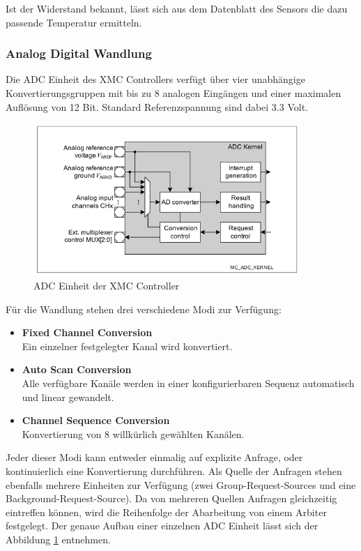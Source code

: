 Ist der Widerstand bekannt, lässt sich aus dem Datenblatt des Sensors die dazu passende Temperatur ermitteln.

\subsubsection{Analog Digital Wandlung}
Die ADC Einheit des XMC Controllers verfügt über vier unabhängige Konvertierungsgruppen mit bis zu 8 analogen Eingängen und einer maximalen Auflösung von 12 Bit. Standard Referenzspannung sind dabei 3.3 Volt.

\begin{figure}[ht]
\centering
\includegraphics[width=0.9\textwidth]{sensor/xmc_adc.PNG}
\caption{ADC Einheit der XMC Controller}
\label{img:xmc_adc}
\end{figure}

Für die Wandlung stehen drei verschiedene Modi zur Verfügung: 
\begin{itemize}
\item \textbf{Fixed Channel Conversion} \\
Ein einzelner festgelegter Kanal wird konvertiert.
\item \textbf{Auto Scan Conversion} \\
Alle verfügbare Kanäle werden in einer konfigurierbaren Sequenz automatisch und linear gewandelt.
\item \textbf{Channel Sequence Conversion} \\
Konvertierung von 8 willkürlich gewählten Kanälen.
\end{itemize}

Jeder dieser Modi kann entweder einmalig auf explizite Anfrage, oder kontinuierlich eine Konvertierung durchführen. Als Quelle der Anfragen stehen ebenfalls mehrere Einheiten zur Verfügung (zwei Group-Request-Sources und eine Background-Request-Source). Da von mehreren Quellen Anfragen gleichzeitig eintreffen können, wird die Reihenfolge der Abarbeitung von einem Arbiter festgelegt. Der genaue Aufbau einer einzelnen ADC Einheit lässt sich der Abbildung \ref{img:xmc_adc} entnehmen. \\

